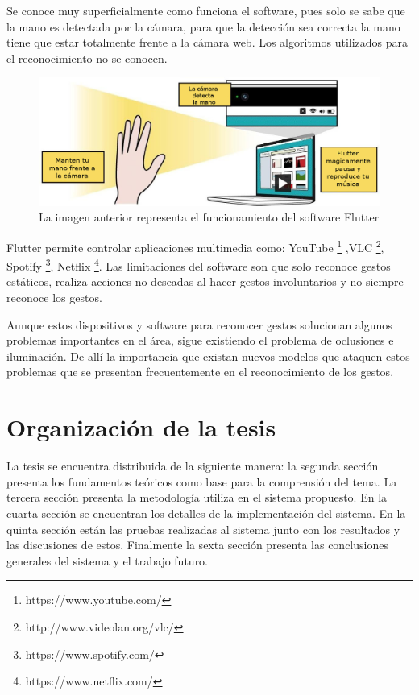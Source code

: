 Se conoce muy superficialmente como funciona el software, pues solo se sabe que la mano es detectada por la cámara, para que la detección sea correcta la mano tiene que estar totalmente frente a la cámara web. Los algoritmos utilizados para el reconocimiento no se conocen.  
\begin{figure}[h!]
\begin{center}
\includegraphics[scale=.4]{./Figures/Flutter.jpg}
\end{center}
\caption{La imagen anterior representa el funcionamiento del software Flutter}
\label{fig:Flutter}
\end{figure}

Flutter permite controlar aplicaciones multimedia como: YouTube \footnote{https://www.youtube.com/} ,VLC \footnote{http://www.videolan.org/vlc/}, Spotify \footnote{https://www.spotify.com/}, Netflix \footnote{https://www.netflix.com/}. Las limitaciones del software son que solo reconoce gestos estáticos, realiza acciones no deseadas al hacer gestos involuntarios y no siempre reconoce los gestos.  


Aunque estos dispositivos y software para reconocer gestos solucionan algunos problemas importantes en el área, sigue existiendo el problema de oclusiones e iluminación.
De allí la importancia que existan nuevos modelos que ataquen estos problemas que se presentan frecuentemente en el reconocimiento de los gestos.



\section{Organizaci\'on de la tesis}\label{OrganizacionTesis}

La tesis se encuentra distribuida de la siguiente manera: la segunda sección presenta los fundamentos teóricos como base para la comprensión del tema. La tercera sección presenta la metodología utiliza en el sistema propuesto. En la cuarta sección se encuentran los detalles de la implementación del sistema. En la quinta sección están las pruebas realizadas al sistema junto con los resultados y las discusiones de estos. Finalmente la sexta sección presenta las conclusiones generales del sistema y el trabajo futuro. 


